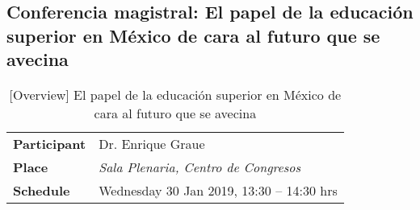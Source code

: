 \documentclass[11pt,a4paper]{article}
\begin{document}
\clearpage

\subsection{Conferencia magistral: El papel de la educación superior en México de cara al futuro que se avecina}\label{sec:conference1}

\parencite{Graue2019}
\begin{table}[h] %
\centering
\begin{tabular}{|l|l|}
\hline
\textbf{Participant} & Dr. Enrique Graue \\
\textbf{Place}       & \emph{Sala Plenaria, Centro de Congresos} \\
\textbf{Schedule}    & Wednesday 30 Jan 2019, 13:30 – 14:30 hrs \\
\hline
\end{tabular}
\caption{[Overview] El papel de la educación superior en México de cara al futuro que se avecina}\label{tab:table}
\end{table}










\end{document}
